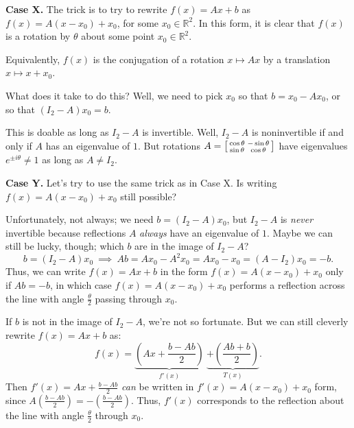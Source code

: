 \textbf{Case X.} The trick is to try to rewrite $f(x) = Ax + b$ as $f(x) = A(x - x_0) + x_0$, for some $x_0 \in \mathbb{R}^2$.  In this form, it is clear that $f(x)$ is a rotation by $\theta$ about some point $x_0 \in \mathbb{R}^2$.

\begin{remark}
    Equivalently, $f(x)$ is the conjugation of a rotation $x \mapsto Ax$ by a translation $x \mapsto x + x_0$.
\end{remark}

What does it take to do this?  Well, we need to pick $x_0$ so that $b = x_0 - Ax_0$, or so that $(I_2 - A)x_0 = b$.

This is doable as long as $I_2 - A$ is invertible.  Well, $I_2 - A$ is noninvertible if and only if $A$ has an eigenvalue of $1$.  But rotations $A = \begin{bsmallmatrix} \cos \theta & - \sin \theta \\ \sin \theta & \cos \theta \end{bsmallmatrix}$ have eigenvalues $e^{\pm i \theta} \neq 1$ as long as $A \neq I_2$. \vspace{0.1cm}


\textbf{Case Y.} Let's try to use the same trick as in Case X.   Is writing $f(x) = A(x - x_0) + x_0$ still possible?

Unfortunately, not always; we need $b = (I_2 - A)x_0$, but $I_2 - A$ is \emph{never} invertible because reflections $A$ \emph{always} have an eigenvalue of $1$.  Maybe we can still be lucky, though; which $b$ are in the image of $I_2 - A$?
\[ b = (I_2 - A)x_0 ~ \implies ~ Ab = Ax_0 - A^2 x_0 = Ax_0 - x_0 = (A - I_2)x_0 = -b. \]
Thus, we can write $f(x) = Ax + b$ in the form $f(x) = A(x - x_0) + x_0$ only if $Ab = -b$, in which case $f(x) = A(x - x_0) + x_0$ performs a reflection across the line with angle $\frac{\theta}{2}$ passing through $x_0$.

If $b$ is not in the image of $I_2 - A$, we're not so fortunate.  But we can still cleverly rewrite $f(x) = Ax + b$ as:
\[ f(x) = \underbrace{\left(Ax + \dfrac{b - Ab}{2}\right)}_{f'(x)} \ \underbrace{+ \left(\dfrac{Ab + b}{2}\right)}_{T(x)}.  \] 
Then $f'(x) = Ax + \frac{b - Ab}{2}$ \emph{can} be written in $f'(x) = A(x - x_0) + x_0$ form, since $A\left(\frac{b - Ab}{2}\right) = -\left(\frac{b - Ab}{2}\right)$.  Thus, $f'(x)$ corresponds to the reflection about the line with angle $\frac{\theta}{2}$ through $x_0$.

